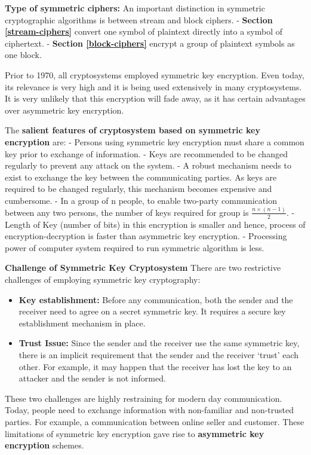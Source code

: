 \documentclass[11pt]{article}
\begin{document}
\textbf{Type of symmetric ciphers:} An important distinction in
symmetric cryptographic algorithms is between stream and block ciphers.
- \textbf{Section \ref{stream-ciphers}} convert one symbol of plaintext
directly into a symbol of ciphertext. -
\textbf{Section \ref{block-ciphers}} encrypt a group of plaintext
symbols as one block.

Prior to 1970, all cryptosystems employed symmetric key encryption. Even
today, its relevance is very high and it is being used extensively in
many cryptosystems. It is very unlikely that this encryption will fade
away, as it has certain advantages over asymmetric key encryption.

The \textbf{salient features of cryptosystem based on symmetric key
encryption} are: - Persons using symmetric key encryption must share a
common key prior to exchange of information. - Keys are recommended to
be changed regularly to prevent any attack on the system. - A robust
mechanism needs to exist to exchange the key between the communicating
parties. As keys are required to be changed regularly, this mechanism
becomes expensive and cumbersome. - In a group of n people, to enable
two-party communication between any two persons, the number of keys
required for group is \(\frac{n\times (n-1)}{2}\). - Length of Key
(number of bits) in this encryption is smaller and hence, process of
encryption-decryption is faster than asymmetric key encryption. -
Processing power of computer system required to run symmetric algorithm
is less.

\textbf{Challenge of Symmetric Key Cryptosystem} There are two
restrictive challenges of employing symmetric key cryptography:

\begin{itemize}
\item
  \textbf{Key establishment:} Before any communication, both the sender
  and the receiver need to agree on a secret symmetric key. It requires
  a secure key establishment mechanism in place.
\item
  \textbf{Trust Issue:} Since the sender and the receiver use the same
  symmetric key, there is an implicit requirement that the sender and
  the receiver `trust' each other. For example, it may happen that the
  receiver has lost the key to an attacker and the sender is not
  informed.
\end{itemize}

These two challenges are highly restraining for modern day
communication. Today, people need to exchange information with
non-familiar and non-trusted parties. For example, a communication
between online seller and customer. These limitations of symmetric key
encryption gave rise to \textbf{asymmetric key encryption} schemes.
\end{document}
